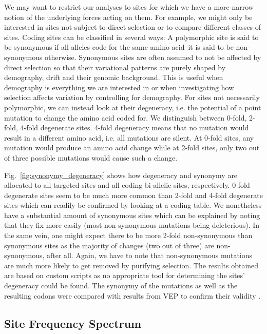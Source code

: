 \documentclass[hidelinks,11pt]{article}
\begin{document}
{    We may want to restrict our analyses to sites for which we have a more narrow notion of the underlying forces acting on them. For example, we might only be interested in sites not subject to direct selection or to compare different classes of sites. Coding sites can be classified in several ways: A polymorphic site is said to be synonymous if all alleles code for the same amino acid--it is said to be non-synonymous otherwise. Synonymous sites are often assumed to not be affected by direct selection so that their variational patterns are purely shaped by demography, drift and their genomic background. This is useful when demography is everything we are interested in or when investigating how selection affects variation by controlling for demography. For sites not necessarily polymorphic, we can instead look at their degeneracy, i.e. the potential of a point mutation to change the amino acid coded for. We distinguish between 0-fold, 2-fold, 4-fold degenerate sites. 4-fold degeneracy means that no mutation would result in a different amino acid, i.e. all mutations are silent. At 0-fold sites, any mutation would produce an amino acid change while at 2-fold sites, only two out of three possible mutations would cause such a change.

    Fig.~\ref{fig:synonymy_degeneracy} shows how degeneracy and synonymy are allocated to all targeted sites and all coding bi-allelic sites, respectively. 0-fold degenerate sites seem to be much more common than 2-fold and 4-fold degenerate sites which can readily be confirmed by looking at a coding table. We nonetheless have a substantial amount of synonymous sites which can be explained by noting that they fix more easily (most non-synonymous mutations being deleterious). In the same vein, one might expect there to be more 2-fold non-synonymous than synonymous sites as the majority of changes (two out of three) are non-synonymous, after all. Again, we have to note that non-synonymous mutations are much more likely to get removed by purifying selection. The results obtained are based on custom scripts as no appropriate tool for determining the sites' degeneracy could be found. The synonymy of the mutations as well as the resulting codons were compared with results from VEP to confirm their validity \cite{vep}.

    \subsection{Site Frequency Spectrum}
    \label{sec:sfs}

}
\end{document}
